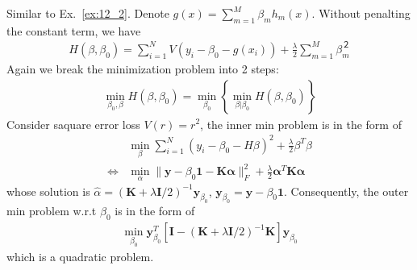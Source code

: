 \begin{exercise}
  Similar to Ex.~\eqref{ex:12_2}. Denote $g(x)=\sum_{m=1}^M\beta_mh_m(x)$.
  Without penalting the constant term, we have
  \begin{align}
    H(\beta, \beta_0) = \sum_{i=1}^NV(y_i-\beta_0-g(x_i)) +
    \frac{\lambda}{2}\sum_{m=1}^M\beta_m^２
  \end{align}
  Again we break the minimization problem into 2 steps:
  \begin{align}
    \min_{\beta_0,\beta}H(\beta, \beta_0) =
    \min_{\beta_0}\left\{\min_{\beta|\beta_0}H(\beta, \beta_0)\right\}
  \end{align}
  Consider saquare error loss $V(r) = r^2$, the inner min problem is in the form
  of 
  \begin{align}
    & \min_{\beta}\sum_{i=1}^N
    (y_i-\beta_0-H\beta)^2 + \frac{\lambda}{2}\beta^T\beta \\
    \Leftrightarrow & \min_\alpha \|\mathbf{y} - \beta_0\mathbf{1} -
    \mathbf{K}\bm{\alpha}\|_F^2 +
    \frac{\lambda}{2}\bm{\alpha}^T\mathbf{K}\bm{\alpha}
  \end{align}
  whose solution is $\hat{\alpha} = (\mathbf{K} +
  \lambda\mathbf{I}/2)^{-1}\mathbf{y}_{\beta_0}$, $\mathbf{y}_{\beta_0} =
  \mathbf{y} - \beta_0\mathbf{1}$. Consequently, the outer min problem w.r.t
  $\beta_0$ is in the form of
  \begin{align}
    \min_{\beta_0} \mathbf{y}_{\beta_0}^T\left[\mathbf{I} - (\mathbf{K} +
    \lambda\mathbf{I}/2)^{-1}\mathbf{K}\right]\mathbf{y}_{\beta_0}
  \end{align}
  which is a quadratic problem.
\end{exercise}

